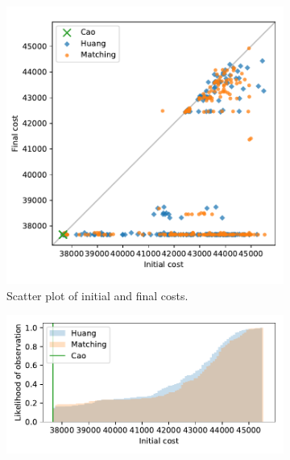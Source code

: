 \documentclass[smallextended]{svjour3}
\begin{document}
\begin{figure}
    \begin{subfigure}{.5\textwidth}
        \includegraphics[width=\linewidth]{Fig6a.pdf}
        \caption{Scatter plot of initial and final costs.}
    \end{subfigure}
    \hfill%
    \begin{subfigure}{.5\textwidth}
        \includegraphics[width=\linewidth]{Fig6b1.pdf}


\end{subfigure}
\end{figure}
\end{document}
